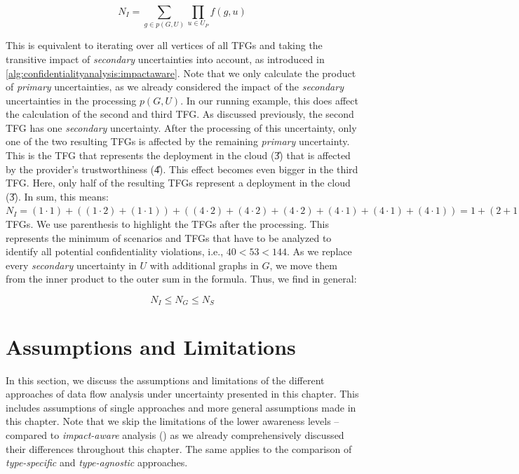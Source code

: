 \begin{equation*}
    N_{I} = \sum_{g \in p(G,U)} \prod_{u \in U_{P}} f(g,u)
\end{equation*}

This is equivalent to iterating over all vertices of all \acp{TFG} and taking the transitive impact of \emph{secondary} uncertainties into account, as introduced in \autoref{alg:confidentialityanalysis:impactaware}.
Note that we only calculate the product of \emph{primary} uncertainties, as we already considered the impact of the \emph{secondary} uncertainties in the processing $p(G,U)$.
In our running example, this does affect the calculation of the second and third \ac{TFG}.
As discussed previously, the second \ac{TFG} has one \emph{secondary} uncertainty.
After the processing of this uncertainty, only one of the two resulting \acp{TFG} is affected by the remaining \emph{primary} uncertainty.
This is the \ac{TFG} that represents the deployment in the cloud (\U{3}) that is affected by the provider's trustworthiness (\U{4}).
This effect becomes even bigger in the third \ac{TFG}.
Here, only half of the resulting \acp{TFG} represent a deployment in the cloud (\U{3}).
In sum, this means: $N_{I} = (1 \cdot 1) + ((1 \cdot 2) + (1 \cdot 1)) + ((4 \cdot 2) + (4 \cdot 2) + (4 \cdot 2) + (4 \cdot 1) + (4 \cdot 1) + (4 \cdot 1)) = 1 + (2 + 1) + (8 + 8 + 8 + 4 + 4 + 4) = 1 + 3 + 36 = 40$ \acp{TFG}.
We use parenthesis to highlight the \acp{TFG} after the processing.
This represents the minimum of scenarios and \acp{TFG} that have to be analyzed to identify all potential confidentiality violations, i.e., $40 < 53 < 144$.
As we replace every \emph{secondary} uncertainty in $U$ with additional graphs in $G$, we move them from the inner product to the outer sum in the formula.
Thus, we find in general: 

\begin{equation*}
    N_{I} \leq N_{G} \leq N_{S}
\end{equation*}





\section{Assumptions and Limitations}%
\label{sec:confidentialityanalysis:assumptions}

In this section, we discuss the assumptions and limitations of the different approaches of data flow analysis under uncertainty presented in this chapter.
This includes assumptions of single approaches and more general assumptions made in this chapter.
Note that we skip the limitations of the lower awareness levels  --  compared to \emph{impact-aware} analysis () as we already comprehensively discussed their differences throughout this chapter.
The same applies to the comparison of \emph{type-specific} and \emph{type-agnostic} approaches.

